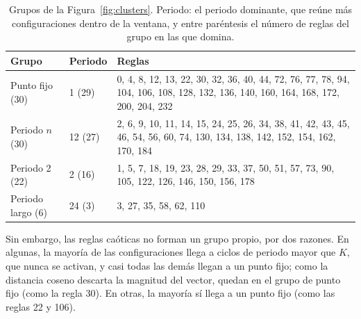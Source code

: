 \begin{table}[!ht]
\centering
\setlength{\tabcolsep}{4pt}
\begin{tabular}{p{} p{} p{}}
\hline
Grupo & Periodo & Reglas \\
\hline
Punto fijo (30) & 1 (29) & 0, 4, 8, 12, 13, 22, 30, 32, 36, 40, 44, 72, 76, 77, 78, 94, 104, 106, 108, 128, 132, 136, 140, 160, 164, 168, 172, 200, 204, 232 \\
Periodo $n$ (30) & 12 (27) & 2, 6, 9, 10, 11, 14, 15, 24, 25, 26, 34, 38, 41, 42, 43, 45, 46, 54, 56, 60, 74, 130, 134, 138, 142, 152, 154, 162, 170, 184 \\
Periodo 2 (22) & 2 (16) & 1, 5, 7, 18, 19, 23, 28, 29, 33, 37, 50, 51, 57, 73, 90, 105, 122, 126, 146, 150, 156, 178 \\
Periodo largo (6) & 24 (3) & 3, 27, 35, 58, 62, 110 \\
\hline
\end{tabular}
\caption{Grupos de la Figura~\ref{fig:clusters}. Periodo: el periodo dominante, que reúne más configuraciones dentro de la ventana, y entre paréntesis el número de reglas del grupo en las que domina.}
\label{tab:clusters}
\end{table}

Sin embargo, las reglas caóticas no forman un grupo propio, por dos razones. En algunas, la mayoría de las configuraciones llega a ciclos de periodo mayor que $K$, que nunca se activan, y casi todas las demás llegan a un punto fijo; como la distancia coseno descarta la magnitud del vector, quedan en el grupo de punto fijo (como la regla 30). En otras, la mayoría sí llega a un punto fijo (como las reglas 22 y 106).
